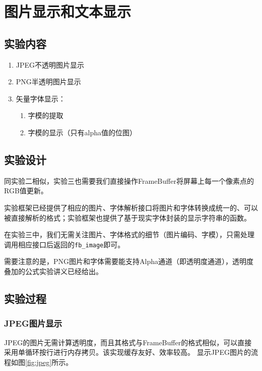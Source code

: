 \documentclass{report}
\begin{document}
\chapter{图片显示和文本显示}
\section{实验内容}

\begin{enumerate}
    \item JPEG不透明图片显示
    \item PNG半透明图片显示
    \item 矢量字体显示：
        \begin{enumerate}
            \item 字模的提取
            \item 字模的显示（只有alpha值的位图）
        \end{enumerate}
\end{enumerate}

\section{实验设计}

\par 同实验二相似，实验三也需要我们直接操作FrameBuffer将屏幕上每一个像素点的RGB值更新。
\par 实验框架已经提供了相应的图片、字体解析接口将图片和字体转换成统一的、可以被直接解析的格式；实验框架也提供了基于现实字体封装的显示字符串的函数。
\par 在实验三中，我们无需关注图片、字体格式的细节（图片编码、字模），只需处理调用相应接口后返回的\lstinline|fb_image|即可。
\par 需要注意的是，PNG图片和字体需要能支持Alpha通道（即透明度通道），透明度叠加的公式实验讲义已经给出。

\section{实验过程}
\subsection{JPEG图片显示}
\par JPEG的图片无需计算透明度，而且其格式与FrameBuffer的格式相似，可以直接采用单循环按行进行内存拷贝。该实现缓存友好、效率较高。 显示JPEG图片的流程如图\ref{fig:jpeg}所示。
\end{document}
